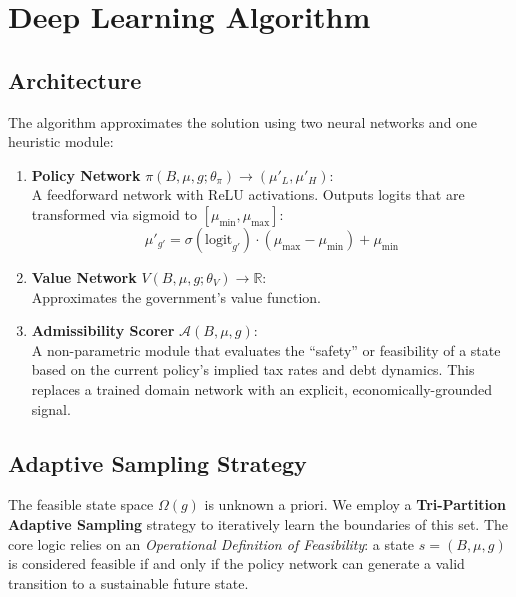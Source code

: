 \section{Deep Learning Algorithm}

\subsection{Architecture}

The algorithm approximates the solution using two neural networks and one heuristic module:

\begin{enumerate}
    \item \textbf{Policy Network} $\pi(B, \mu, g; \theta_{\pi}) \to (\mu'_{L}, \mu'_{H})$: \\
    A feedforward network with ReLU activations. Outputs logits that are transformed via sigmoid to $[\mu_{\min}, \mu_{\max}]$:
    \[ \mu'_{g'} = \sigma(\text{logit}_{g'}) \cdot (\mu_{\max} - \mu_{\min}) + \mu_{\min} \]
    
    \item \textbf{Value Network} $V(B, \mu, g; \theta_V) \to \mathbb{R}$: \\
    Approximates the government's value function.
    
    \item \textbf{Admissibility Scorer} $\mathcal{A}(B, \mu, g)$: \\
    A non-parametric module that evaluates the ``safety'' or feasibility of a state based on the current policy's implied tax rates and debt dynamics. 
    This replaces a trained domain network with an explicit, economically-grounded signal.
\end{enumerate}



\subsection{Adaptive Sampling Strategy}

The feasible state space $\Omega(g)$ is unknown a priori. We employ a \textbf{Tri-Partition Adaptive Sampling} strategy to iteratively learn the boundaries of this set. The core logic relies on an \textit{Operational Definition of Feasibility}: a state $s=(B, \mu, g)$ is considered feasible if and only if the policy network can generate a valid transition to a sustainable future state.

